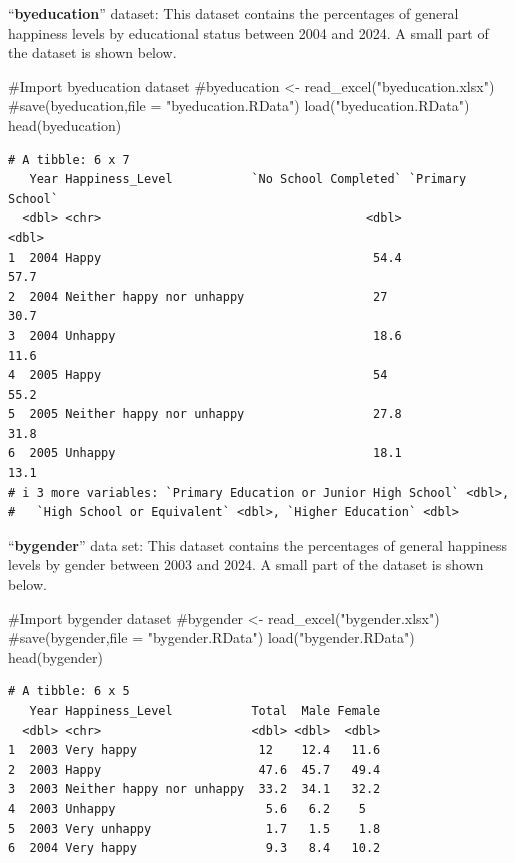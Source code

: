 \documentclass[
  11pt,
  a4paper,
  DIV=11,
  numbers=noendperiod]{scrartcl}
\newenvironment{Shaded}{\begin{snugshade}}{\end{snugshade}}
\newcommand{\CommentTok}[1]{\textcolor[rgb]{0.37,0.37,0.37}{#1}}
\newcommand{\FunctionTok}[1]{\textcolor[rgb]{0.28,0.35,0.67}{#1}}
\newcommand{\NormalTok}[1]{\textcolor[rgb]{0.00,0.23,0.31}{#1}}
\newcommand{\StringTok}[1]{\textcolor[rgb]{0.13,0.47,0.30}{#1}}
\begin{document}
{``\textbf{byeducation}}'' dataset: This dataset contains the
percentages of general happiness levels by educational status between
2004 and 2024. A small part of the dataset is shown below.

\begin{Shaded}
\begin{Highlighting}[]
\CommentTok{\#Import byeducation dataset}
\CommentTok{\#byeducation \textless{}{-} read\_excel("byeducation.xlsx")}
\CommentTok{\#save(byeducation,file = "byeducation.RData")}
\FunctionTok{load}\NormalTok{(}\StringTok{"byeducation.RData"}\NormalTok{)}
\FunctionTok{head}\NormalTok{(byeducation)}
\end{Highlighting}
\end{Shaded}

\begin{verbatim}
# A tibble: 6 x 7
   Year Happiness_Level           `No School Completed` `Primary  School`
  <dbl> <chr>                                     <dbl>             <dbl>
1  2004 Happy                                      54.4              57.7
2  2004 Neither happy nor unhappy                  27                30.7
3  2004 Unhappy                                    18.6              11.6
4  2005 Happy                                      54                55.2
5  2005 Neither happy nor unhappy                  27.8              31.8
6  2005 Unhappy                                    18.1              13.1
# i 3 more variables: `Primary Education or Junior High School` <dbl>,
#   `High School or Equivalent` <dbl>, `Higher Education` <dbl>
\end{verbatim}

{``\textbf{bygender}''} data set: This dataset contains the percentages
of general happiness levels by gender between 2003 and 2024. A small
part of the dataset is shown below.

\begin{Shaded}
\begin{Highlighting}[]
\CommentTok{\#Import bygender dataset}
\CommentTok{\#bygender \textless{}{-} read\_excel("bygender.xlsx")}
\CommentTok{\#save(bygender,file = "bygender.RData")}
\FunctionTok{load}\NormalTok{(}\StringTok{"bygender.RData"}\NormalTok{)}
\FunctionTok{head}\NormalTok{(bygender)}
\end{Highlighting}
\end{Shaded}

\begin{verbatim}
# A tibble: 6 x 5
   Year Happiness_Level           Total  Male Female
  <dbl> <chr>                     <dbl> <dbl>  <dbl>
1  2003 Very happy                 12    12.4   11.6
2  2003 Happy                      47.6  45.7   49.4
3  2003 Neither happy nor unhappy  33.2  34.1   32.2
4  2003 Unhappy                     5.6   6.2    5  
5  2003 Very unhappy                1.7   1.5    1.8
6  2004 Very happy                  9.3   8.4   10.2
\end{verbatim}
\end{document}

